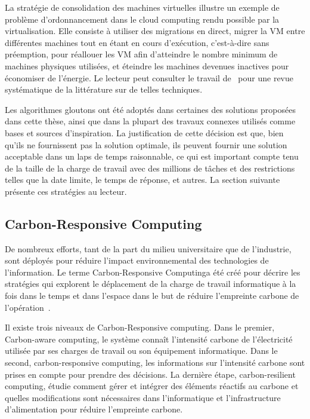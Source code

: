 La stratégie de consolidation des machines virtuelles illustre un exemple de problème d'ordonnancement dans le cloud computing rendu possible par la virtualisation. Elle consiste à utiliser des migrations en direct, migrer la VM entre différentes machines tout en étant en cours d'exécution, c'est-à-dire sans préemption, pour réallouer les VM afin d'atteindre le nombre minimum de machines physiques utilisées, et éteindre les machines devenues inactives pour économiser de l'énergie. Le lecteur peut consulter le travail de~\citet{10.1145/3470972} pour une revue systématique de la littérature sur de telles techniques.

Les algorithmes gloutons ont été adoptés dans certaines des solutions proposées dans cette thèse, ainsi que dans la plupart des travaux connexes utilisés comme bases et sources d'inspiration. La justification de cette décision est que, bien qu'ils ne fournissent pas la solution optimale, ils peuvent fournir une solution acceptable dans un laps de temps raisonnable, ce qui est important compte tenu de la taille de la charge de travail avec des millions de tâches et des restrictions telles que la date limite, le temps de réponse, et autres. La section suivante présente ces stratégies au lecteur.



\subsection{Carbon-Responsive Computing}

\label{sec:carbon_responsive_resume}

De nombreux efforts, tant de la part du milieu universitaire que de l'industrie, sont déployés pour réduire l'impact environnemental des technologies de l'information. Le terme \guillemotleft Carbon-Responsive Computing\guillemotright a été créé pour décrire les stratégies qui explorent le déplacement de la charge de travail informatique à la fois dans le temps et dans l'espace dans le but de réduire l'empreinte carbone de l'opération~\cite{schooler2021carbonaware}.

Il existe trois niveaux de Carbon-Responsive computing. Dans le premier, Carbon-aware computing, le système connaît l'intensité carbone de l'électricité utilisée par ses charges de travail ou son équipement informatique. Dans le second, carbon-responsive computing, les informations sur l'intensité carbone sont prises en compte pour prendre des décisions. La dernière étape, carbon-resilient computing, étudie comment gérer et intégrer des éléments réactifs au carbone et quelles modifications sont nécessaires dans l'informatique et l'infrastructure d'alimentation pour réduire l'empreinte carbone.



